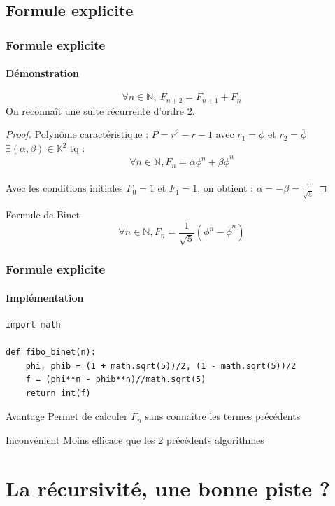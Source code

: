 \documentclass[10pt]{beamer}
\begin{document}
\subsection{Formule explicite}
\begin{frame}
\frametitle{Formule explicite}
\framesubtitle{Démonstration}
\[
   \forall n \in \mathbb{N}, \ F_{n+2} = F_{n+1} + F_n
\]
On reconnaît une suite récurrente d'ordre 2.
\begin{proof}
Polynôme caractéristique : $P = r^2 - r - 1$ avec $r_1 = \phi$ et $r_2 = \overline{\phi}$ \vspace*{3mm}
$\exists (\alpha, \beta) \in \mathbb{K}^2$ tq : \[\forall n \in \mathbb{N}, F_n = \alpha\phi^n + \beta\overline{\phi}^n\]
\\
Avec les conditions initiales $F_0 = 1$ et $F_1 = 1$, on obtient : $\alpha = - \beta = \frac{1}{\sqrt{5}}$
\end{proof}
\pause
\begin{alertblock}{Formule de Binet}
\[
   \forall n \in \mathbb{N}, F_n = \frac{1}{\sqrt{5}}\left (\phi^n - \overline{\phi}^n \right )
\]
\end{alertblock}
\end{frame}

\begin{frame}[fragile]
\frametitle{Formule explicite}
\framesubtitle{Implémentation}
\begin{verbatim}
import math

def fibo_binet(n):
    phi, phib = (1 + math.sqrt(5))/2, (1 - math.sqrt(5))/2
    f = (phi**n - phib**n)//math.sqrt(5)
    return int(f)
\end{verbatim}
\begin{exampleblock}{Avantage}
Permet de calculer $F_n$ sans connaître les termes précédents
\end{exampleblock}

\begin{alertblock}{Inconvénient}
Moins efficace que les 2 précédents algorithmes
\end{alertblock}
\end{frame}

\section{La récursivité, une bonne piste ?}
\end{document}
